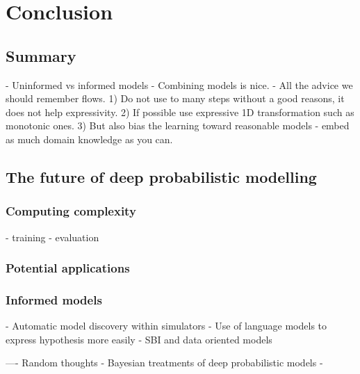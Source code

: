 \chapter{Conclusion}\label{ch:08}


\section{Summary}
- Uninformed vs informed models
- Combining models is nice.
- All the advice we should remember flows.
  1) Do not use to many steps without a good reasons, it does not help expressivity.
  2) If possible use expressive 1D transformation such as monotonic ones.
  3) But also bias the learning toward reasonable models - embed as much domain knowledge as you can.


\section{The future of deep probabilistic modelling}
\subsection{Computing complexity}
- training
- evaluation

\subsection{Potential applications}

\subsection{Informed models}
- Automatic model discovery within simulators
- Use of language models to express hypothesis more easily
- SBI and data oriented models

---- Random thoughts
- Bayesian treatments of deep probabilistic models
-
